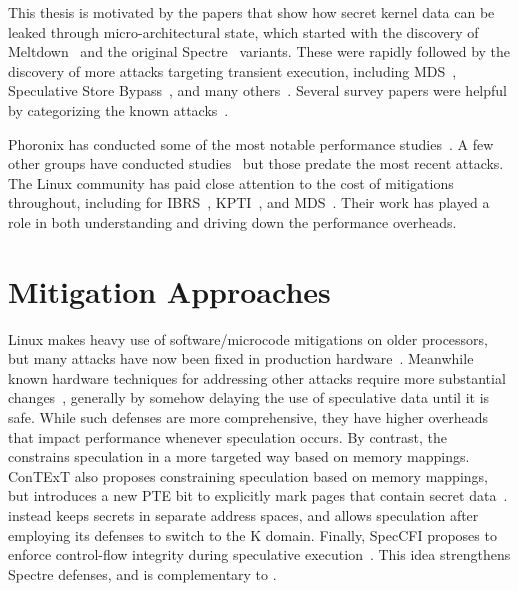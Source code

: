 \label{s:related}

This thesis is motivated by the papers that show how secret kernel data
can be leaked through micro-architectural state, which started with the discovery of Meltdown~\cite{lipp:meltdown} and the original Spectre~\cite{kocher:spectre} variants.
These were rapidly followed by the discovery of more attacks targeting transient execution, including MDS~\cite{canella:fallout,schwarz:zombieload,schaik:ridl}, Speculative Store Bypass~\cite{horn:speculative-store-bypass}, and many others~\cite{bhattacharyya:smotherspectre,bulck:foreshadow,chen:sgxspectre,koruyeh:spectrersb,ragab:crosstalk,stecklina:lazyfp,schaik:cacheout,weisse:foreshadow-ng, bulck:lvi}.
Several survey papers were helpful by categorizing the known attacks~\cite{hill:survey,sok:transient,xiong:survey}.

Phoronix has conducted some of the most notable performance studies~\cite{phoronix:perf-zombieload, phoronix:two-years, phoronix:three-years}. A few other groups have conducted studies~\cite{nikolay:meltdown-spectre-performance,prout:measuring-spectre-meltdown} but those predate the most recent attacks.
The Linux community has paid close attention to the cost of mitigations throughout, including for IBRS~\cite{linus:ibrs-rant},  KPTI~\cite{gregg:kpti-perfromance}, and MDS~\cite{phoronix:perf-zombieload}.
Their work has played a role in both understanding and driving down the performance overheads.

\section{Mitigation Approaches}

Linux makes heavy use of software/microcode mitigations on older processors, but many attacks have now been fixed in production hardware~\cite{intel:affected-processors}.
Meanwhile known hardware techniques for addressing other attacks require more substantial changes~\cite{barber:specshield, weisse:nda, ainsworth:muontrap,yu:stt,yu:sdo}, generally by somehow delaying the use of speculative data until it is safe.
While such defenses are
more comprehensive, they have higher overheads that impact performance whenever
speculation occurs.
By contrast, the \contract constrains speculation in a more
targeted way based on memory mappings. ConTExT also proposes constraining
speculation based on memory mappings, but introduces a new PTE bit to explicitly
mark pages that contain secret data~\cite{ConTExT}. \sys instead keeps secrets in
separate address spaces, and allows speculation after employing its defenses to
switch to the K domain.  Finally, SpecCFI proposes to enforce control-flow
integrity during speculative execution~\cite{koruyeh:speccfi}. This idea strengthens
Spectre defenses, and is complementary to \sys.

